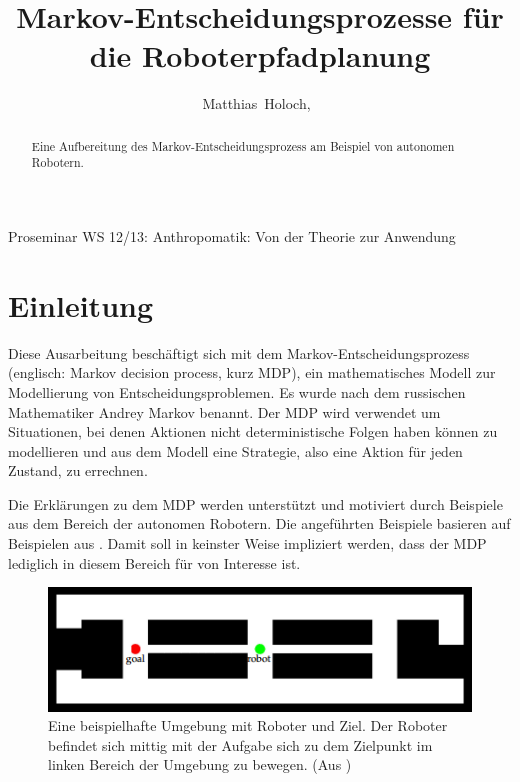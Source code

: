 \documentclass[a4paper]{IEEEtran}
\begin{document}
\title{Markov-Entscheidungsprozesse für die Roboterpfadplanung}

\author{Matthias~Holoch,~}%




%
{Proseminar WS 12/13: Anthropomatik: Von der Theorie zur Anwendung}



\maketitle


\begin{abstract}
Eine Aufbereitung des Markov-Entscheidungsprozess am Beispiel von autonomen Robotern. 
\end{abstract}


\section{Einleitung}
Diese Ausarbeitung beschäftigt sich mit dem Markov-Entscheidungsprozess (englisch: Markov decision process, kurz MDP), ein mathematisches Modell zur Modellierung von Entscheidungsproblemen. Es wurde nach dem russischen Mathematiker Andrey Markov benannt. Der MDP wird verwendet um Situationen, bei denen Aktionen nicht deterministische Folgen haben können zu modellieren und aus dem Modell eine Strategie, also eine Aktion für jeden Zustand, zu errechnen.

Die Erklärungen zu dem MDP werden unterstützt und motiviert durch Beispiele aus dem Bereich der autonomen Robotern. Die angeführten Beispiele basieren auf Beispielen aus \cite{thrun2005probabilistic}. Damit soll in keinster Weise impliziert werden, dass der MDP lediglich in diesem Bereich für von Interesse ist.

\begin{figure}[ht]
	\centering
	\includegraphics[scale=0.72]{images/autnmRobot_basicSituation.png}
	\caption{Eine beispielhafte Umgebung mit Roboter und Ziel. Der Roboter befindet sich mittig mit der Aufgabe sich zu dem Zielpunkt im linken Bereich der Umgebung zu bewegen. (Aus \cite{thrun2005probabilistic})}
	\label{fig:autnmRob_bSit}
\end{figure}
\end{document}
